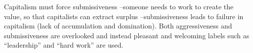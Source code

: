 \documentclass[11pt, letterpaper]{article}
\begin{document}
\begin{spacing}{2.0}

 Capitalism must force submissiveness%
--someone needs to work to create the  value, so that capitalists can extract
surplus \citep{marx10,harvey14}--submissiveness leads to failure in capitalism
 (lack of accumulation and domination).
%
%
%
%
Both aggressiveness and submissiveness are overlooked and instead %
pleasant and welcoming labels such as ``leadership'' and ``hard work'' are
used. %
%



\end{spacing}
\end{document}
